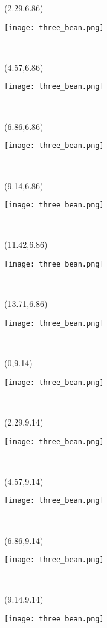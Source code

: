 \documentclass[a4paper]{article}
\newcommand{\myXthreeBean}[0]{
\texttt{[image: three\_bean.png]}
}
\newcommand{\mycard}[5]{%
	\vspace{0.35cm}
	\tiny #1 #2
	\parbox[t][2.29\TPVertModule][c]{0.150\paperwidth}{%
	\hspace{-0.65cm} \large#3\\
	}
}
\begin{document}
\begin{textblock}{2.29}(2.29,6.86)
\mycard{}{}{
\myXthreeBean
}{}{} 
\end{textblock}

\begin{textblock}{2.29}(4.57,6.86)
\mycard{}{}{
\myXthreeBean
}{}{} 
\end{textblock}

\begin{textblock}{2.29}(6.86,6.86)
\mycard{}{}{
\myXthreeBean
}{}{} 
\end{textblock}

\begin{textblock}{2.29}(9.14,6.86)
\mycard{}{}{
\myXthreeBean
}{}{} 
\end{textblock}

\begin{textblock}{2.29}(11.42,6.86)
\mycard{}{}{
\myXthreeBean
}{}{} 
\end{textblock}

\begin{textblock}{2.29}(13.71,6.86)
\mycard{}{}{
\myXthreeBean
}{}{} 
\end{textblock}


\begin{textblock}{2.29}(0,9.14)
\mycard{}{}{
\myXthreeBean
}{}{} 
\end{textblock}

\begin{textblock}{2.29}(2.29,9.14)
\mycard{}{}{
\myXthreeBean
}{}{} 
\end{textblock}

\begin{textblock}{2.29}(4.57,9.14)
\mycard{}{}{
\myXthreeBean
}{}{} 
\end{textblock}

\begin{textblock}{2.29}(6.86,9.14)
\mycard{}{}{
\myXthreeBean
}{}{} 
\end{textblock}

\begin{textblock}{2.29}(9.14,9.14)
\mycard{}{}{
\myXthreeBean
}{}{} 
\end{textblock}
\end{document}
